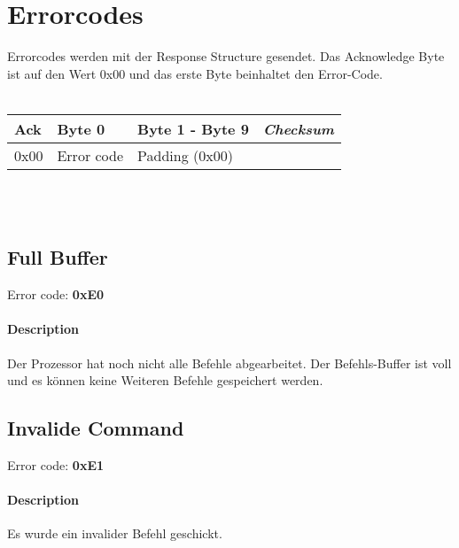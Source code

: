 \documentclass[10pt,a4paper]{article}
\begin{document}
\newpage
\section{Errorcodes}
Errorcodes werden mit der Response Structure gesendet. 
Das Acknowledge Byte ist auf den Wert 0x00 und das erste Byte beinhaltet den Error-Code.\\\\
\begin{tabular}{|p{1.2cm}|p{2cm}|p{4cm}|p{2cm}|}
	\hline
 		Ack & Byte 0 & Byte 1 - Byte 9 & \textit{Checksum}\\\hline
	 	0x00 & Error code & Padding (0x00) & \\ \hline
\end{tabular}\\\\

\subsection{Full Buffer}
Error code: \textbf{0xE0}
\paragraph*{Description\\}
Der Prozessor hat noch nicht alle Befehle abgearbeitet. Der Befehls-Buffer ist voll und es können keine Weiteren Befehle gespeichert werden.

\subsection{Invalide Command}

Error code: \textbf{0xE1}
\paragraph*{Description\\}
Es wurde ein invalider Befehl geschickt.
\end{document}
